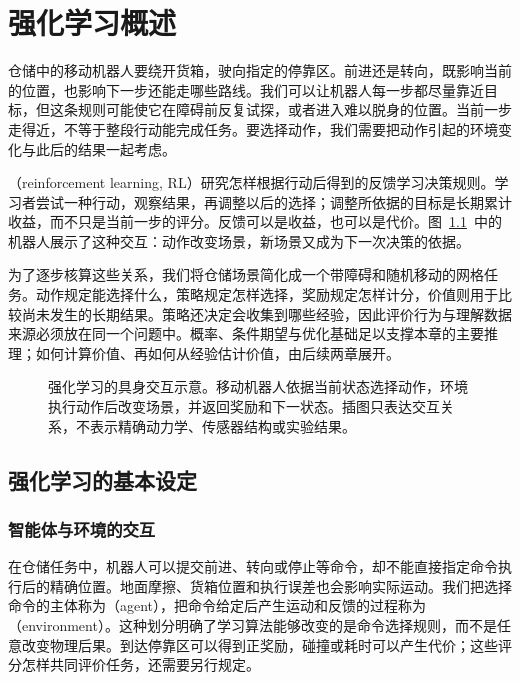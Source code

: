 \chapter{强化学习概述}
\label{chap:rl-overview}

仓储中的移动机器人要绕开货箱，驶向指定的停靠区。前进还是转向，既影响当前的位置，也影响下一步还能走哪些路线。我们可以让机器人每一步都尽量靠近目标，但这条规则可能使它在障碍前反复试探，或者进入难以脱身的位置。当前一步走得近，不等于整段行动能完成任务。要选择动作，我们需要把动作引起的环境变化与此后的结果一起考虑。

（reinforcement learning, RL）研究怎样根据行动后得到的反馈学习决策规则。学习者尝试一种行动，观察结果，再调整以后的选择；调整所依据的目标是长期累计收益，而不只是当前一步的评分。反馈可以是收益，也可以是代价。图~\ref{fig:rl-overview-embodied-setting}~中的机器人展示了这种交互：动作改变场景，新场景又成为下一次决策的依据。

为了逐步核算这些关系，我们将仓储场景简化成一个带障碍和随机移动的网格任务。动作规定能选择什么，策略规定怎样选择，奖励规定怎样计分，价值则用于比较尚未发生的长期结果。策略还决定会收集到哪些经验，因此评价行为与理解数据来源必须放在同一个问题中。概率、条件期望与优化基础足以支撑本章的主要推理；如何计算价值、再如何从经验估计价值，由后续两章展开。

\begin{figure}[htbp]
  \centering
  
  \caption{强化学习的具身交互示意。移动机器人依据当前状态选择动作，环境执行动作后改变场景，并返回奖励和下一状态。插图只表达交互关系，不表示精确动力学、传感器结构或实验结果。}
  \label{fig:rl-overview-embodied-setting}
\end{figure}

\section{强化学习的基本设定}
\label{sec:rl-overview-setting}

\subsection{智能体与环境的交互}
\label{sec:rl-overview-interaction}

在仓储任务中，机器人可以提交前进、转向或停止等命令，却不能直接指定命令执行后的精确位置。地面摩擦、货箱位置和执行误差也会影响实际运动。我们把选择命令的主体称为（agent），把命令给定后产生运动和反馈的过程称为（environment）。这种划分明确了学习算法能够改变的是命令选择规则，而不是任意改变物理后果。到达停靠区可以得到正奖励，碰撞或耗时可以产生代价；这些评分怎样共同评价任务，还需要另行规定。

